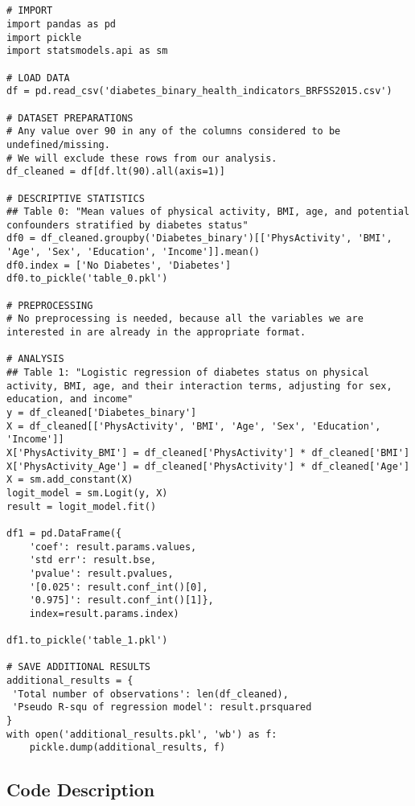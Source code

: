 \documentclass[11pt]{article}
\begin{document}
\begin{verbatim}


# IMPORT
import pandas as pd
import pickle
import statsmodels.api as sm

# LOAD DATA
df = pd.read_csv('diabetes_binary_health_indicators_BRFSS2015.csv')

# DATASET PREPARATIONS
# Any value over 90 in any of the columns considered to be undefined/missing. 
# We will exclude these rows from our analysis.
df_cleaned = df[df.lt(90).all(axis=1)]

# DESCRIPTIVE STATISTICS
## Table 0: "Mean values of physical activity, BMI, age, and potential confounders stratified by diabetes status"
df0 = df_cleaned.groupby('Diabetes_binary')[['PhysActivity', 'BMI', 'Age', 'Sex', 'Education', 'Income']].mean()
df0.index = ['No Diabetes', 'Diabetes']
df0.to_pickle('table_0.pkl')

# PREPROCESSING
# No preprocessing is needed, because all the variables we are interested in are already in the appropriate format.

# ANALYSIS
## Table 1: "Logistic regression of diabetes status on physical activity, BMI, age, and their interaction terms, adjusting for sex, education, and income"
y = df_cleaned['Diabetes_binary']
X = df_cleaned[['PhysActivity', 'BMI', 'Age', 'Sex', 'Education', 'Income']]
X['PhysActivity_BMI'] = df_cleaned['PhysActivity'] * df_cleaned['BMI']
X['PhysActivity_Age'] = df_cleaned['PhysActivity'] * df_cleaned['Age']
X = sm.add_constant(X)
logit_model = sm.Logit(y, X)
result = logit_model.fit()

df1 = pd.DataFrame({
    'coef': result.params.values,
    'std err': result.bse, 
    'pvalue': result.pvalues,
    '[0.025': result.conf_int()[0],
    '0.975]': result.conf_int()[1]}, 
    index=result.params.index)

df1.to_pickle('table_1.pkl')

# SAVE ADDITIONAL RESULTS
additional_results = {
 'Total number of observations': len(df_cleaned),
 'Pseudo R-squ of regression model': result.prsquared
}
with open('additional_results.pkl', 'wb') as f:
    pickle.dump(additional_results, f)

\end{verbatim}

\subsection{Code Description}
\end{document}
